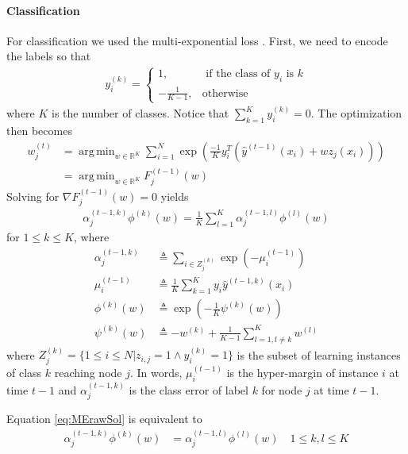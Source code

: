\documentclass{article}
\DeclareMathOperator*{\argmin}{arg\,min}
\begin{document}
\paragraph{Classification}
For classification we used the multi-exponential loss 
\cite{zhu2009multiadaboost}. First, we need to encode the labels so that
\begin{align}\label{eq:MEencode}
y_i^{(k)} = \begin{cases}
1, &\text{ if the class of } y_i \text{ is } k \\
-\frac{1}{K-1}, &\text{otherwise}
\end{cases}
\end{align}
where $K$ is the number of classes. Notice that $\sum_{k=1}^{K} y_i^{(k)} = 0$.
The optimization then becomes
\begin{align}\label{eq:MEmin}
w_j^{(t)} &=  \argmin_{w \in \mathbb{R}^K} \sum_{i=1}^N \exp 
\left(\frac{-1}{K} y_i^T \left(\hat{y}^{(t-1)}(x_i) + w z_j(x_i) \right)\right) 
\\
&= \argmin_{w \in \mathbb{R}^K} F_j^{(t-1)}(w)
\end{align}
Solving for $\nabla F_j^{(t-1)}(w) = 0$ yields
\begin{align}\label{eq:MErawSol}
\alpha_j^{(t-1, k)}\phi^{(k)}(w) = \frac{1}{K} \sum_{l=1}^{K} \alpha_j^{(t-1, 
l)}\phi^{(l)}(w)
\end{align}
for $1 \leq k\leq K$, where
\begin{align}
\alpha_j^{(t-1, k)} &\triangleq \sum_{i \in Z_j^{(k)}} \exp \left( - 
\mu_i^{(t-1)} \right) \\
\mu_i^{(t-1)} &\triangleq \frac{1}{K} \sum_{k=1}^{K} y_i \hat{y}^{(t-1, 
k)}(x_i) \\
\phi^{(k)}(w) &\triangleq \exp \left( - \frac{1}{K} \psi^{(k)}(w) \right) \\
\psi^{(k)}(w) &\triangleq -w^{(k)} + \frac{1}{K-1} \sum_{l=1, l\neq k}^{K}  
w^{(l)}
\end{align}
where $Z_j^{(k)} = \{1 \leq i \leq N | z_{i,j} = 1 \wedge y_i^{(k)} = 1 \}$ is 
the subset of learning instances of class $k$ reaching node $j$. In words, 
$\mu_i^{(t-1)}$ is the hyper-margin of instance $i$ at time $t-1$ and 
$\alpha_j^{(t-1, k)}$ is the class error of label $k$ for node $j$ at time 
$t-1$.


Equation \ref{eq:MErawSol} is equivalent to
\begin{align}\label{eq:MEequation}
\alpha_j^{(t-1, k)}\phi^{(k)}(w) &= \alpha_j^{(t-1, l)}\phi^{(l)}(w) \quad 1 
\leq k,l \leq K
\end{align}
\end{document}
